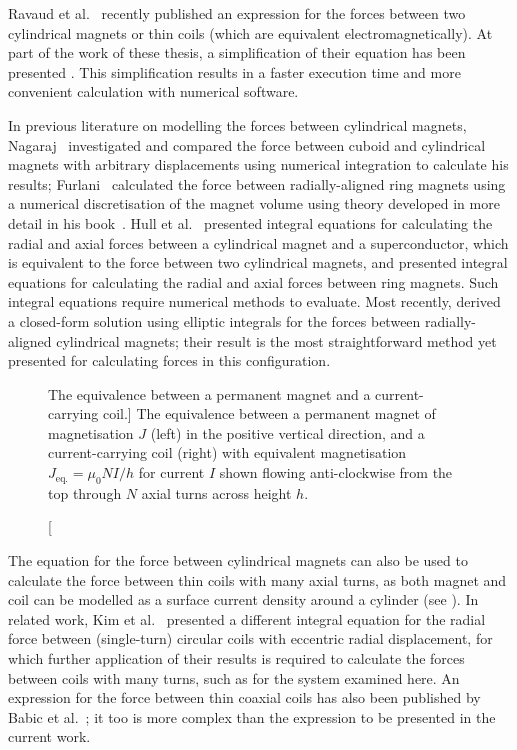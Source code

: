 \documentclass[11pt,a4paper]{memoir}
\begin{document}
Ravaud et al.~\cite{ravaud2010-ietm} recently published an expression for the forces between two cylindrical magnets or thin coils (which are equivalent electromagnetically). At part of the work of these thesis, a simplification of their equation has been presented \parencite{robertson2011-ietm}.
This simplification results in a faster execution time and more convenient calculation with numerical software.

In previous literature on modelling the forces between cylindrical magnets,
Nagaraj~\cite{nagaraj1988} investigated and compared the force between cuboid and cylindrical magnets with arbitrary displacements using numerical integration to calculate his results; Furlani~\cite{furlani1993-ietm,furlani1993-ietm-coupl} calculated the force between radially-aligned ring magnets using a numerical discretisation of the magnet volume using theory developed in more detail in his book~\cite{furlani2001-magnetbook}. Hull et al.~\cite{hull1999-japplphys} presented integral equations for calculating the radial and axial forces between a cylindrical magnet and a superconductor, which is equivalent to the force between two cylindrical magnets, and \textcite{bassani2006-trib-int} presented integral equations for calculating the radial and axial forces between ring magnets. Such integral equations require numerical methods to evaluate.
Most recently, \textcite{ravaud2010-ietm} derived a closed-form solution using elliptic integrals for the forces between radially-aligned cylindrical magnets; their result is the most straightforward method yet presented for calculating forces in this configuration.

\begin{figure}
\centering
{}
\caption
[The equivalence between a permanent magnet and a current-carrying coil.]
{The equivalence between a permanent magnet of magnetisation $J$ (left) in the positive vertical direction, and a current-carrying coil (right) with equivalent magnetisation $J_{\text{eq.}}=\mu_0 N I/h$ for current $I$ shown flowing anti-clockwise from the top through $N$ axial turns across height $h$.}
\end{figure}

The equation for the force between cylindrical magnets can also be used to calculate the force between thin coils with many axial turns, as both magnet and coil can be modelled as a surface current density around a cylinder (see ). In related work, Kim et al.~\cite{kim1996-ietm} presented a different integral equation for the radial force between (single-turn) circular coils with eccentric radial displacement, for which further application of their results is required to calculate the forces between coils with many turns, such as for the system examined here. An expression for the force between thin coaxial coils has also been published by Babic et al.~\cite{babic2008-ietm}; it too is more complex than the expression to be presented in the current work.
\end{document}
